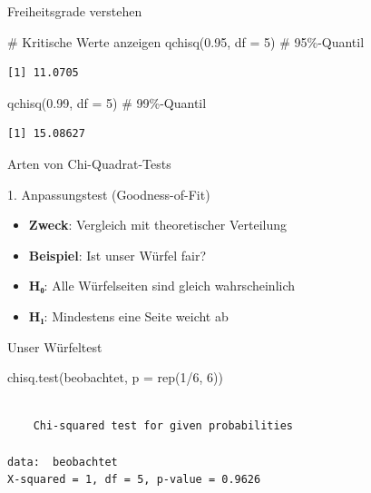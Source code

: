 \documentclass[
  ignorenonframetext,
]{beamer}
\newenvironment{Shaded}{\begin{snugshade}}{\end{snugshade}}
\newcommand{\AttributeTok}[1]{\textcolor[rgb]{0.40,0.45,0.13}{#1}}
\newcommand{\CommentTok}[1]{\textcolor[rgb]{0.37,0.37,0.37}{#1}}
\newcommand{\DecValTok}[1]{\textcolor[rgb]{0.68,0.00,0.00}{#1}}
\newcommand{\FloatTok}[1]{\textcolor[rgb]{0.68,0.00,0.00}{#1}}
\newcommand{\FunctionTok}[1]{\textcolor[rgb]{0.28,0.35,0.67}{#1}}
\newcommand{\NormalTok}[1]{\textcolor[rgb]{0.00,0.23,0.31}{#1}}
\newcommand{\SpecialCharTok}[1]{\textcolor[rgb]{0.37,0.37,0.37}{#1}}
\providecommand{\tightlist}{%
  \setlength{\itemsep}{0pt}\setlength{\parskip}{0pt}}
\begin{document}
\begin{frame}[fragile]{Freiheitsgrade verstehen}
\protect{}\label{freiheitsgrade-verstehen-1}
\begin{Shaded}
\begin{Highlighting}[]
\CommentTok{\# Kritische Werte anzeigen}
\FunctionTok{qchisq}\NormalTok{(}\FloatTok{0.95}\NormalTok{, }\AttributeTok{df =} \DecValTok{5}\NormalTok{)  }\CommentTok{\# 95\%{-}Quantil}
\end{Highlighting}
\end{Shaded}

\begin{verbatim}
[1] 11.0705
\end{verbatim}

\begin{Shaded}
\begin{Highlighting}[]
\FunctionTok{qchisq}\NormalTok{(}\FloatTok{0.99}\NormalTok{, }\AttributeTok{df =} \DecValTok{5}\NormalTok{)  }\CommentTok{\# 99\%{-}Quantil}
\end{Highlighting}
\end{Shaded}

\begin{verbatim}
[1] 15.08627
\end{verbatim}
\end{frame}

\begin{frame}{Arten von Chi-Quadrat-Tests}
\protect{}\label{arten-von-chi-quadrat-tests}
\begin{block}{1. Anpassungstest (Goodness-of-Fit)}
\protect{}\label{anpassungstest-goodness-of-fit}
\begin{itemize}
\tightlist
\item
  \textbf{Zweck}: Vergleich mit theoretischer Verteilung
\item
  \textbf{Beispiel}: Ist unser Würfel fair?
\item
  \textbf{H₀}: Alle Würfelseiten sind gleich wahrscheinlich
\item
  \textbf{H₁}: Mindestens eine Seite weicht ab
\end{itemize}
\end{block}
\end{frame}

\begin{frame}[fragile]{Unser Würfeltest}
\protect{}\label{unser-wuxfcrfeltest}
\begin{Shaded}
\begin{Highlighting}[]
\FunctionTok{chisq.test}\NormalTok{(beobachtet, }\AttributeTok{p =} \FunctionTok{rep}\NormalTok{(}\DecValTok{1}\SpecialCharTok{/}\DecValTok{6}\NormalTok{, }\DecValTok{6}\NormalTok{))}
\end{Highlighting}
\end{Shaded}

\begin{verbatim}

    Chi-squared test for given probabilities

data:  beobachtet
X-squared = 1, df = 5, p-value = 0.9626
\end{verbatim}
\end{frame}
\end{document}
